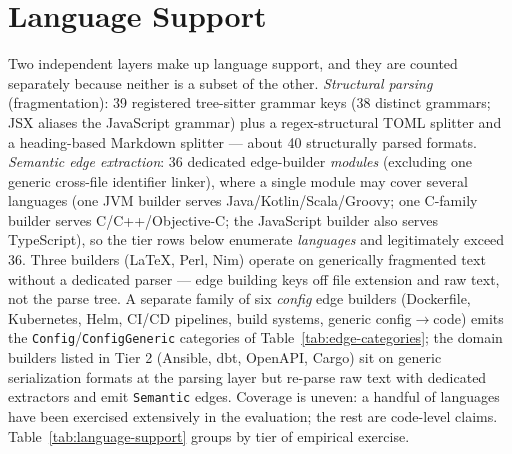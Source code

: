 \documentclass[11pt, a4paper]{article}
\begin{document}
\newpage
\section{Language Support}
\label{sec:impl-inventory}

Two independent layers make up language support, and they are counted separately because neither is a subset of the other. \emph{Structural parsing} (fragmentation): 39 registered tree-sitter grammar keys (38 distinct grammars; JSX aliases the JavaScript grammar) plus a regex-structural TOML splitter and a heading-based Markdown splitter --- about 40 structurally parsed formats. \emph{Semantic edge extraction}: 36 dedicated edge-builder \emph{modules} (excluding one generic cross-file identifier linker), where a single module may cover several languages (one JVM builder serves Java/Kotlin/Scala/Groovy; one C-family builder serves C/C++/Objective-C; the JavaScript builder also serves TypeScript), so the tier rows below enumerate \emph{languages} and legitimately exceed 36. Three builders (LaTeX, Perl, Nim) operate on generically fragmented text without a dedicated parser --- edge building keys off file extension and raw text, not the parse tree. A separate family of six \emph{config} edge builders (Dockerfile, Kubernetes, Helm, CI/CD pipelines, build systems, generic config$\to$code) emits the \texttt{Config}/\texttt{ConfigGeneric} categories of Table~\ref{tab:edge-categories}; the domain builders listed in Tier 2 (Ansible, dbt, OpenAPI, Cargo) sit on generic serialization formats at the parsing layer but re-parse raw text with dedicated extractors and emit \texttt{Semantic} edges. Coverage is uneven: a handful of languages have been exercised extensively in the evaluation; the rest are code-level claims. Table~\ref{tab:language-support} groups by tier of empirical exercise.
\end{document}
